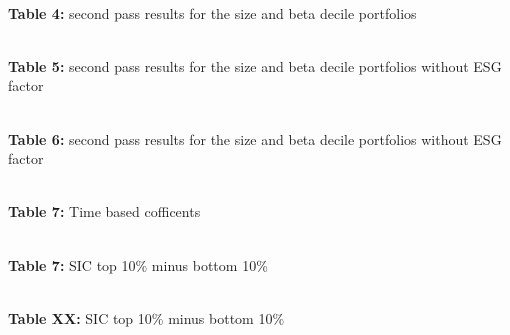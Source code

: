 \documentclass[12pt,oneside,reqno]{amsart}
\begin{document}
\begin{center}
    \paperspacingnarrow
    \\
    \textbf{Table 4:} second pass results for the size and beta decile portfolios\\
    \paperspacingwide
\end{center}


\begin{center}
    \paperspacingnarrow
    \\
    \textbf{Table 5:} second pass results for the size and beta decile portfolios without ESG factor\\
    \paperspacingwide
\end{center}


\begin{center}
    \paperspacingnarrow
    \\
    \textbf{Table 6:} second pass results for the size and beta decile portfolios without ESG factor\\
    \paperspacingwide
\end{center}


\begin{center}
    \paperspacingnarrow
    \\
    \textbf{Table 7:} Time based cofficents
    \paperspacingwide
\end{center}

\begin{center}
    \paperspacingnarrow
\\
\textbf{Table 7:} SIC top 10\% minus bottom 10\%
    \paperspacingwide
\end{center}


\begin{center}
    \paperspacingnarrow
\\
\textbf{Table XX:} SIC top 10\% minus bottom 10\%
    \paperspacingwide
\end{center}
\clearpage
\restoregeometry


%
\end{document}
